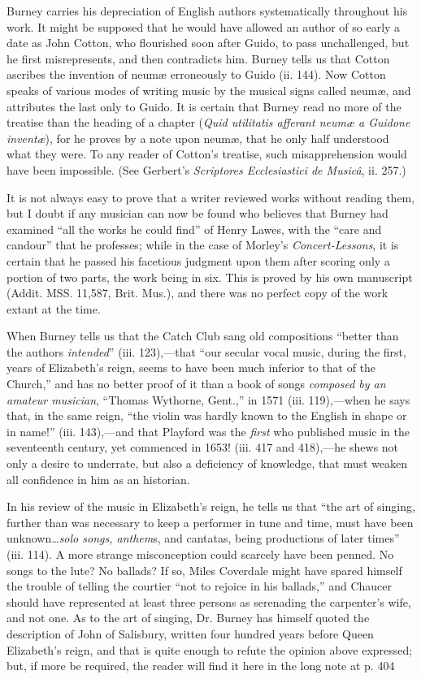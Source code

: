 Burney carries his depreciation of English authors systematically throughout
his work. It might be supposed that he would have allowed an author of so early
a date as John Cotton, who flourished soon after Guido, to pass unchallenged, but
he first misrepresents, and then contradicts him. Burney tells us that Cotton
ascribes the invention of neumæ erroneously to Guido (ii. 144). Now Cotton
speaks of various modes of writing music by the musical signs called neumæ, and
attributes the last only to Guido. It is certain that Burney read no more of the
treatise than the heading of a chapter (\textit{Quid utilitatis afferant neumæ a Guidone
inventæ}), for he proves by a note upon neumæ, that he only half understood what
they were. To any reader of Cotton’s treatise, such misapprehension would have
been impossible. (See Gerbert’s \textit{Scriptores Ecclesiastici de Musicâ}, ii. 257.)

It is not always easy to prove that a writer reviewed works without reading
them, but I doubt if any musician can now be found who believes that Burney
had examined “all the works he could find” of Henry Lawes, with the “care
and candour” that he professes; while in the case of Morley’s \textit{Concert-Lessons},
it is certain that he passed his facetious judgment upon them after scoring only
a portion of two parts, the work being in six. This is proved by his own manuscript
(Addit. MSS. 11,587, Brit. Mus.), and there was no perfect copy of the
work extant at the time.

When Burney tells us that the Catch Club sang old compositions “better than
the authors \textit{intended}” (iii. 123),—that “our secular vocal music, during the first,
years of Elizabeth’s reign, seems to have been much inferior to that of the Church,”
and has no better proof of it than a book of songs \textit{composed by an amateur musician},
“Thomas Wythorne, Gent.,” in 1571 (iii. 119),—when he says that, in
the same reign, “the violin was hardly known to the English in shape or in
name!” (iii. 143),—and that Playford was the \textit{first} who published music in the
seventeenth century, yet commenced in 1653! (iii. 417 and 418),—he shews not
only a desire to underrate, but also a deficiency of knowledge, that must weaken
all confidence in him as an historian.

 

In his review of the music in Elizabeth’s reign, he tells us that “the art of
singing, further than was necessary to keep a performer in tune and time, must
have been unknown\ldots \textit{solo songs, anthem}s, and cantatas, being productions of
later times” (iii. 114). A more strange misconception could scarcely have been
penned. No songs to the lute? No ballads? If so, Miles Coverdale might have
spared himself the trouble of telling the courtier “not to rejoice in his ballads,” 
and Chaucer should have represented
\pagebreak
 at least three persons as serenading the
carpenter’s wife, and not one. As to the art of singing, Dr. Burney has himself 
quoted the description of John of Salisbury, written four hundred years before
Queen Elizabeth’s reign, and that is quite enough to refute the opinion above
expressed; but, if more be required, the reader will find it here in the long note
at p. 404

